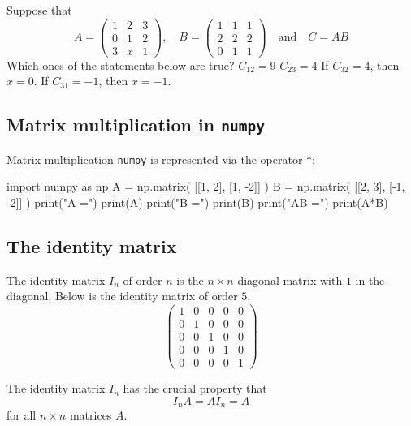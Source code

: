 \documentclass{article}
\begin{document}
\begin{quizexercise}[showhide]
\begin{quiz}
\question
Suppose that
$$
A = 
\begin{pmatrix}
1 & 2 & 3\\
0 & 1 & 2\\
3 & x & 1
\end{pmatrix},
\quad
B = 
\begin{pmatrix}
1& 1 & 1\\
2 & 2 & 2\\
0 & 1 & 1
\end{pmatrix}\quad\text{and}\quad
C = A B
$$
Which ones of the statements below are true?
$C_{12} = 9$
$C_{23} = 4$
If $C_{32} = 4$, then $x = 0$.
If $C_{31} = -1$, then $x=-1$.
\end{quiz}
\end{quizexercise}

\subsection{Matrix multiplication in \texttt{numpy}}

Matrix multiplication \texttt{numpy} is represented via the operator $*$:

\begin{sage}
import numpy as np
A = np.matrix( [[1, 2], [1, -2]] )
B = np.matrix( [[2, 3], [-1, -2]] )
print("A =")
print(A)
print("B =")
print(B)
print("AB =")
print(A*B)
\end{sage}

\subsection{The identity matrix}


The identity matrix $I_n$ of order $n$ is the $n\times n$ diagonal matrix with $1$
in the diagonal. Below is the identity matrix of order $5$.
$$
\begin{pmatrix}
1 & 0 & 0 & 0 & 0\\
0 & 1 & 0 & 0 & 0\\
0 & 0 & 1 & 0 & 0\\
0 & 0 & 0 & 1 & 0\\
0 & 0 & 0 & 0 & 1
\end{pmatrix}
$$

The identity matrix $I_n$ has the crucial property that 
\begin{equation}\label{idmathident}
I_n A = A I_n = A
\end{equation}
for all $n\times n$ matrices $A$.
\end{document}
